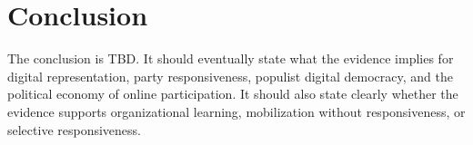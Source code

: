 \section{Conclusion}\label{sec:conclusion}

The conclusion is TBD. It should eventually state what the evidence implies for digital representation, party responsiveness, populist digital democracy, and the political economy of online participation. It should also state clearly whether the evidence supports organizational learning, mobilization without responsiveness, or selective responsiveness.

